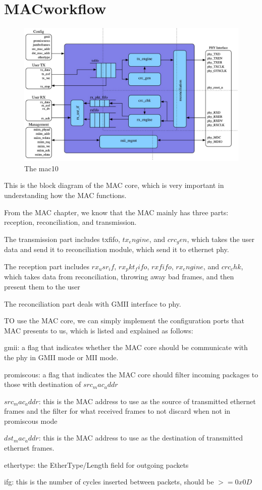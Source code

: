 \chapter{MACworkflow}

\begin{figure}[ht!]
\centering
\includegraphics[scale=0.25]{eps/mac10.eps}
\caption{The mac10}
\label{mac10}
\end{figure}

This is the block diagram of the MAC core, which is very important in understanding how the MAC functions.

From the MAC chapter, we know that the MAC mainly has three parts: reception, reconciliation, and transmission.

The transmission part includes txfifo, $tx_engine$, and $crc_gen$, which takes the user data and send it to reconciliation module, which send it to ethernet phy.

The reception part includes $rx_usr_if$, $rx_pkt_fifo$, $rxfifo$, $rx_engine$, and $crc_chk$, which takes data from reconciliation, throwing away bad frames, and then present them to the user

The reconciliation part deals with GMII interface to phy.

TO use the MAC core, we can simply implement the configuration ports that MAC presents to us, which is listed and explained as follows:

gmii: a flag that indicates whether the MAC core should be communicate with the phy in GMII mode or MII mode.

promiscous: a flag that indicates the MAC core should filter incoming packages to those with destination of $src_mac_addr$

$src_mac_addr$: this is the MAC address to use as the source of transmitted ethernet frames and the filter for what received frames to not discard when not in promiscous mode

$dst_mac_addr$: this is the MAC address to use as the destination of transmitted ethernet frames.

ethertype: the EtherType/Length field for outgoing packets

ifg: this is the number of cycles inserted between packets, should be $>= 0x0D$




